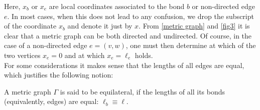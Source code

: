 Here, $x_b$ or $x_e$ are local coordinates associated to the bond $b$ or non-directed edge $e$. In most cases, when this does not lead to any confusion, we drop the subscript of the coordinate $x_b$ and denote it just by $x$. From \cref{metric graph} and \cref{fig3} it is clear that a metric graph can be both directed and undirected. Of course, in the case of a non-directed edge $e = (v, w)$, one must then determine at which of the two vertices $x_e = 0$ and at which $x_e = \ell_e$ holds. \\
For some considerations it makes sense that the lengths of all edges are equal, which justifies the following notion:

\begin{definition}
    \label{metric graph equilateral}
    A metric graph $\Gamma$ is said to be equilateral, if the lengths of all its bonds (equivalently, edges) are equal: $\ell_b \equiv \ell$.
\end{definition}

